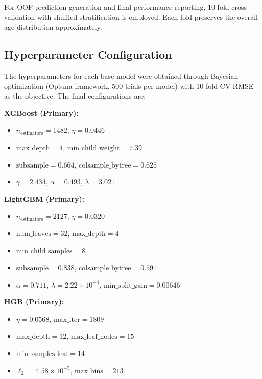 \documentclass[journal]{IEEEtran}
\begin{document}
For OOF prediction generation and final performance reporting, 10-fold cross-validation with shuffled stratification is employed. Each fold preserves the overall age distribution approximately.

\subsection{Hyperparameter Configuration}

The hyperparameters for each base model were obtained through Bayesian optimization (Optuna framework, 500 trials per model) with 10-fold CV RMSE as the objective. The final configurations are:

\noindent\textbf{XGBoost (Primary):}
\begin{itemize}
\setlength{\itemsep}{0pt}
\item $n_{\text{estimators}} = 1482$, $\eta = 0.0446$
\item $\text{max\_depth} = 4$, $\text{min\_child\_weight} = 7.39$
\item $\text{subsample} = 0.664$, $\text{colsample\_bytree} = 0.625$
\item $\gamma = 2.434$, $\alpha = 0.493$, $\lambda = 3.021$
\end{itemize}

\noindent\textbf{LightGBM (Primary):}
\begin{itemize}
\setlength{\itemsep}{0pt}
\item $n_{\text{estimators}} = 2127$, $\eta = 0.0320$
\item $\text{num\_leaves} = 32$, $\text{max\_depth} = 4$
\item $\text{min\_child\_samples} = 8$
\item $\text{subsample} = 0.838$, $\text{colsample\_bytree} = 0.591$
\item $\alpha = 0.711$, $\lambda = 2.22 \times 10^{-4}$, $\text{min\_split\_gain} = 0.00646$
\end{itemize}

\noindent\textbf{HGB (Primary):}
\begin{itemize}
\setlength{\itemsep}{0pt}
\item $\eta = 0.0568$, $\text{max\_iter} = 1809$
\item $\text{max\_depth} = 12$, $\text{max\_leaf\_nodes} = 15$
\item $\text{min\_samples\_leaf} = 14$
\item $\ell_2 = 4.58 \times 10^{-5}$, $\text{max\_bins} = 213$
\end{itemize}
\end{document}
